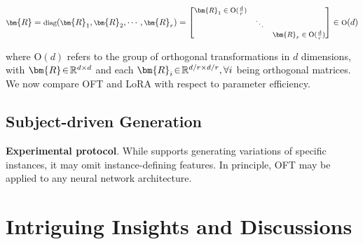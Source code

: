 \begin{itemize}[leftmargin=*,nosep]
\begin{equation}
    \footnotesize
    \bm{R} = \text{diag}(\bm{R}_1, \bm{R}_2, \cdots, \bm{R}_r) = \begin{bmatrix}
    \bm{R}_1 \in \text{O}(\frac{d}{r}) &  &\\
    & \ddots & \\
    & & \bm{R}_r \in \text{O}(\frac{d}{r})
    \end{bmatrix} \in \text{O}(d)
\end{equation}

where $\text{O}(d)$ refers to the group of orthogonal transformations in $d$ dimensions, with $\thickmuskip=2mu \medmuskip=2mu \bm{R}\in\mathbb{R}^{d\times d}$ and each $\thickmuskip=2mu \medmuskip=2mu \bm{R}_i\in\mathbb{R}^{d/r\times d/r},\forall i$ being orthogonal matrices. We now compare OFT and LoRA with respect to parameter efficiency. \subsection{Subject-driven Generation}

\textbf{Experimental protocol}. While \cite{casanova2021instance} supports generating variations of specific instances, it may omit instance-defining features. In principle, OFT may be applied to any neural network architecture. \section{Intriguing Insights and Discussions}


\end{itemize}
